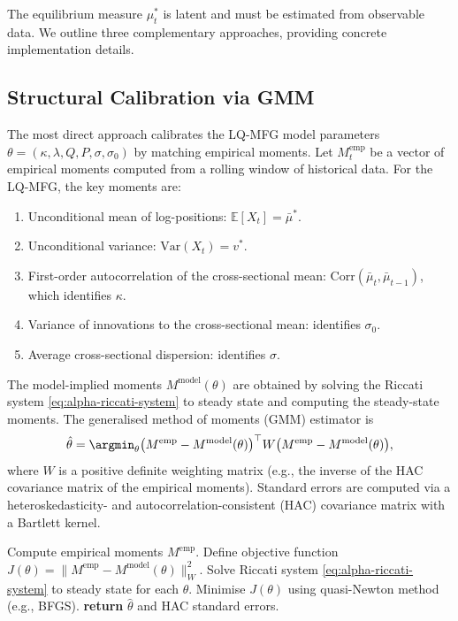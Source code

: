 The equilibrium measure $\mu_t^*$ is latent and must be estimated from observable
data. We outline three complementary approaches, providing concrete implementation
details.

\subsection{Structural Calibration via GMM}

The most direct approach calibrates the LQ-MFG model parameters
$\theta = (\kappa, \lambda, Q, P, \sigma, \sigma_0)$ by matching empirical moments.
Let $M_t^{\mathrm{emp}}$ be a vector of empirical moments computed from a rolling
window of historical data. For the LQ-MFG, the key moments are:

\begin{enumerate}
    \item Unconditional mean of log-positions: $\mathbb{E}[X_t] = \bar\mu^*$.
    \item Unconditional variance: $\mathrm{Var}(X_t) = v^*$.
    \item First-order autocorrelation of the cross-sectional mean:
    $\mathrm{Corr}(\bar\mu_t, \bar\mu_{t-1})$, which identifies $\kappa$.
    \item Variance of innovations to the cross-sectional mean: identifies
    $\sigma_0$.
    \item Average cross-sectional dispersion: identifies $\sigma$.
\end{enumerate}

The model-implied moments $M^{\mathrm{model}}(\theta)$ are obtained by solving the
Riccati system \eqref{eq:alpha-riccati-system} to steady state and computing the
steady-state moments. The generalised method of moments (GMM) estimator is
\[
    \hat\theta = \argmin_\theta \big( M^{\mathrm{emp}} - M^{\mathrm{model}}(\theta)
    \big)^\top W \big( M^{\mathrm{emp}} - M^{\mathrm{model}}(\theta) \big),
\]
where $W$ is a positive definite weighting matrix (e.g., the inverse of the HAC
covariance matrix of the empirical moments). Standard errors are computed via a
heteroskedasticity- and autocorrelation-consistent (HAC) covariance matrix with a
Bartlett kernel.

\begin{algorithm}[ht]
\caption{GMM Calibration of LQ-MFG}
\label{alg:gmm-calibration}
\begin{algorithmic}[1]
\State Compute empirical moments $M^{\mathrm{emp}}$.
\State Define objective function $J(\theta) = \|M^{\mathrm{emp}} -
    M^{\mathrm{model}}(\theta)\|_W^2$.
\State Solve Riccati system \eqref{eq:alpha-riccati-system} to steady state for
    each $\theta$.
\State Minimise $J(\theta)$ using quasi-Newton method (e.g., BFGS).
\State \textbf{return} $\hat\theta$ and HAC standard errors.
\end{algorithmic}
\end{algorithm}

